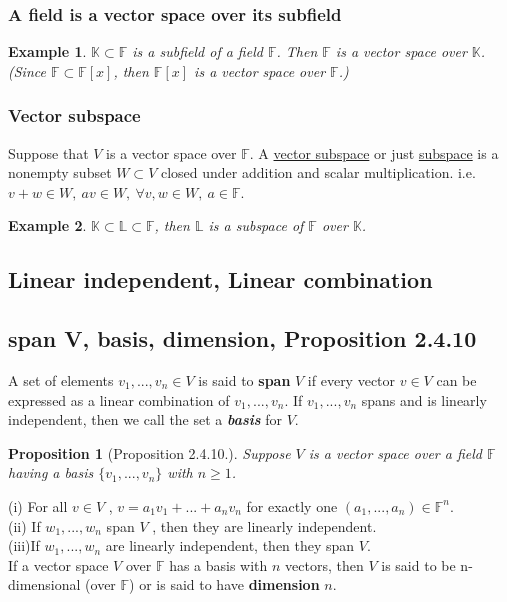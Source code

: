 \documentclass[11pt,a4paper]{article}
\newtheorem{proposition}{Proposition}
\newtheorem{example}{Example}
\begin{document}
\subsubsection{A field is a vector space over its subfield}
\begin{example}
$\mathbb{K}\subset\mathbb{F}$ is a subfield of a field $\mathbb{F}$. Then $\mathbb{F}$ is a vector space over $\mathbb{K}$. (Since $\mathbb{F}\subset \mathbb{F}[x]$, then $\mathbb{F}[x]$ is a vector space over $\mathbb{F}$.)
\end{example}
\subsubsection{ Vector subspace}
Suppose that $V$ is a vector space over $\mathbb{F}$. A \underline{vector subspace} or just \underline{subspace} is a nonempty subset $W\subset V$ closed under addition and scalar multiplication. i.e. $v+w\in W,\ av\in W,\ \forall v,w\in W,\ a\in \mathbb{F}$.\\
\begin{example}
$\mathbb{K}\subset \mathbb{L}\subset \mathbb{F}$, then $\mathbb{L}$ is a subspace of $\mathbb{F}$ over $\mathbb{K}$.
\end{example}
\subsection{Linear independent, Linear combination}
\subsection{span V, basis, dimension, Proposition 2.4.10}
A set of elements $v_1,...,v_n\in V$ is said to \textbf{span} $V$ if every vector $v\in V$ can be expressed as a linear combination of $v_1,...,v_n$. If $v_1,...,v_n$ spans and is linearly independent, then we call the set a \textbf{\textit{basis}} for $V$.
\begin{proposition}[Proposition 2.4.10.]
    Suppose $V$ is a vector space over a field $\mathbb{F}$ having a basis $\{v_1,...,v_n\}$ with $n \geq 1$.
\end{proposition}
(i) For all $v \in V$ , $v = a_1 v_1 + ... + a_n v_n$ for exactly one $(a_1,...,a_n)\in \mathbb{F}^n$.\\
(ii) If $w_1,...,w_n$ span $V$ , then they are linearly independent.\\
(iii)If $w_1,...,w_n$ are linearly independent, then they span $V$.\\
If a vector space $V$ over $\mathbb{F}$ has a basis with $n$ vectors, then $V$ is said to be n-dimensional (over $\mathbb{F}$) or is said to have \textbf{dimension} $n$.
\end{document}
